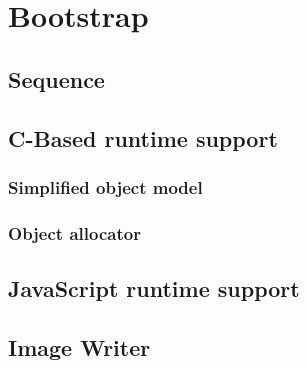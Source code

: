 \chapter{Bootstrap}
\label{chap:Bootstrap}

\section{Sequence}

\section{C-Based runtime support}

\subsection{Simplified object model}

\subsection{Object allocator}

\section{JavaScript runtime support}

\section{Image Writer}

